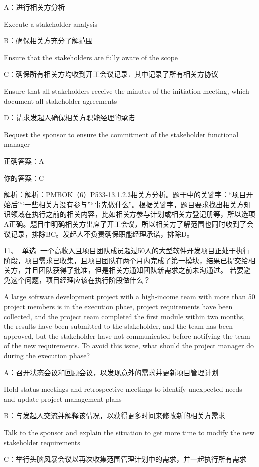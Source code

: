 A：进行相关方分析

Execute a stakeholder analysis

B：确保相关方充分了解范围

Ensure that the stakeholders are fully aware of the scope

C：确保所有相关方均收到开工会议记录，其中记录了所有相关方协议

Ensure that all stakeholders receive the minutes of the initiation meeting, which document all stakeholder agreements

D：请求发起人确保相关方职能经理的承诺

Request the sponsor to ensure the commitment of the stakeholder functional manager

正确答案：A

你的答案：C

解析：解析：PMBOK（6）P533-13.1.2.3相关方分析。题干中的关键字：“项目开始后”“一些相关方没有参与”“事先做什么”。根据关键字，题目要求找出相关方知识领域在执行之前的相关内容，比如相关方参与计划或相关方登记册等，所以选项A正确。题目中明确相关方出席了开工会议，所以相关方了解范围也同时收到了会议记录，排除BC。发起人不负责确保职能经理承诺，排除D。

11、 [单选] 一个高收入且项目团队成员超过50人的大型软件开发项目正处于执行阶段，项目需求已收集，且项目团队在两个月内完成了第一模块，结果已提交给相关方，并且团队获得了批准，但是相关方通知团队新需求之前未沟通过。 若要避免这个问题，项目经理应该在执行阶段做什么？

A large software development project with a high-income team with more than 50 project members is in the execution phase, project requirements have been collected, and the project team completed the first module within two months, the results have been submitted to the stakeholder, and the team has been approved, but the stakeholder have not communicated before notifying the team of the new requirements. To avoid this issue, what should the project manager do during the execution phase?

A：召开状态会议和回顾会议，以发现意外的需求并更新项目管理计划

Hold status meetings and retrospective meetings to identify unexpected needs and update project management plans

B：与发起人交流并解释该情况，以获得更多时间来修改新的相关方需求

Talk to the sponsor and explain the situation to get more time to modify the new stakeholder requirements

C：举行头脑风暴会议以再次收集范围管理计划中的需求，并一起执行所有需求

